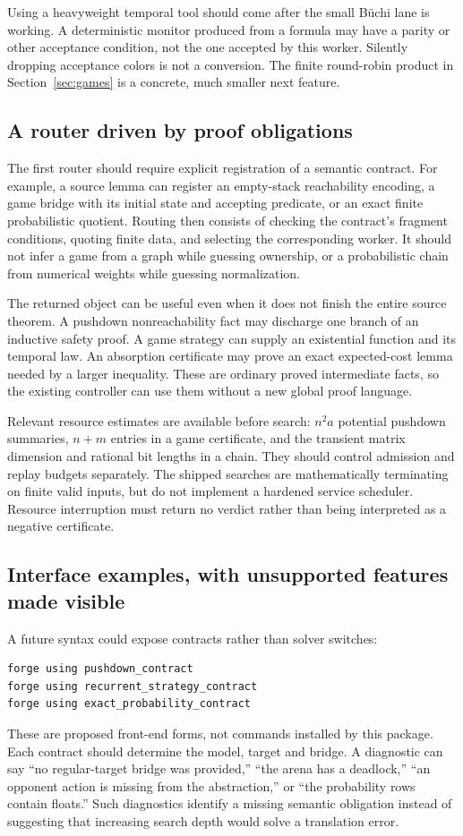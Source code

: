 Using a heavyweight temporal tool should come after the small B\"uchi lane is
working. A deterministic monitor produced from a formula may have a parity or
other acceptance condition, not the one accepted by this worker. Silently
dropping acceptance colors is not a conversion. The finite round-robin product
in Section~\ref{sec:games} is a concrete, much smaller next feature.

\subsection{A router driven by proof obligations}
The first router should require explicit registration of a semantic contract.
For example, a source lemma can register an empty-stack reachability encoding,
a game bridge with its initial state and accepting predicate, or an exact
finite probabilistic quotient. Routing then consists of checking the contract's
fragment conditions, quoting finite data, and selecting the corresponding
worker. It should not infer a game from a graph while guessing ownership, or a
probabilistic chain from numerical weights while guessing normalization.

The returned object can be useful even when it does not finish the entire
source theorem. A pushdown nonreachability fact may discharge one branch of an
inductive safety proof. A game strategy can supply an existential function and
its temporal law. An absorption certificate may prove an exact expected-cost
lemma needed by a larger inequality. These are ordinary proved intermediate
facts, so the existing controller can use them without a new global proof
language.

Relevant resource estimates are available before search: $n^2a$ potential
pushdown summaries, $n+m$ entries in a game certificate, and the transient
matrix dimension and rational bit lengths in a chain. They should control
admission and replay budgets separately. The shipped searches are mathematically
terminating on finite valid inputs, but do not implement a hardened service
scheduler. Resource interruption must return no verdict rather than being
interpreted as a negative certificate.

\subsection{Interface examples, with unsupported features made visible}
A future syntax could expose contracts rather than solver switches:
\begin{lstlisting}
forge using pushdown_contract
forge using recurrent_strategy_contract
forge using exact_probability_contract
\end{lstlisting}
These are proposed front-end forms, not commands installed by this package.
Each contract should determine the model, target and bridge. A diagnostic can
say ``no regular-target bridge was provided,'' ``the arena has a deadlock,''
``an opponent action is missing from the abstraction,'' or ``the probability
rows contain floats.'' Such diagnostics identify a missing semantic obligation
instead of suggesting that increasing search depth would solve a translation
error.

